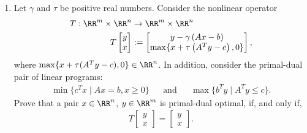 \documentclass[11pt]{article}
\begin{document}
\begin{enumerate}
\item Let $\gamma$ and $\tau$ be positive real numbers. Consider the nonlinear operator 
\begin{align*}
T : \RR^m \times \RR^n &\rightarrow \RR^m \times \RR^n\\
T \begin{bmatrix} 
y \\ 
x
\end{bmatrix} &:= 
\begin{bmatrix} 
y - \gamma  \left(Ax - b\right) \\
\max\{ x + \tau \left(A^Ty - c\right), 0\}
\end{bmatrix},
\end{align*}
where $\max\{x + \tau(A^Ty - c), 0\} \in \RR^n$. In addition, consider the primal-dual pair of linear programs:
\begin{align*}
\min\{ c^Tx \mid Ax = b, x \geq 0\} && \text{and} && \max\{b^T y \mid A^T y\leq  c\}.
\end{align*}
Prove that a pair $x \in \RR^n$, $y \in \RR^m$ is primal-dual optimal, if, and only if, 
\begin{align*}
T\begin{bmatrix} 
y \\ 
x
\end{bmatrix} = \begin{bmatrix} 
y \\ 
x
\end{bmatrix}.
\end{align*}
\end{enumerate}
\end{document}
